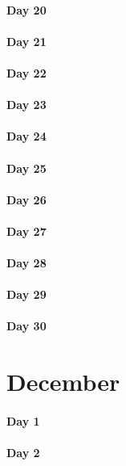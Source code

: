 \documentclass[UTF8,a4paper,8pt]{ctexart}
\begin{document}
 	 \paragraph{Day 20      \quad     }
 	 \paragraph{Day 21      \quad     }
 	 \paragraph{Day 22      \quad     }
 	 \paragraph{Day 23      \quad     }
 	 \paragraph{Day 24      \quad     }
 	 \paragraph{Day 25      \quad     }
 	 \paragraph{Day 26      \quad     }
 	 \paragraph{Day 27      \quad     }
 	 \paragraph{Day 28      \quad     }
 	 \paragraph{Day 29      \quad     }   
 	 \paragraph{Day 30      \quad     }
\section{December}
 	 \paragraph{Day 1       \quad     }
 	 \paragraph{Day 2       \quad     }
\end{document}
